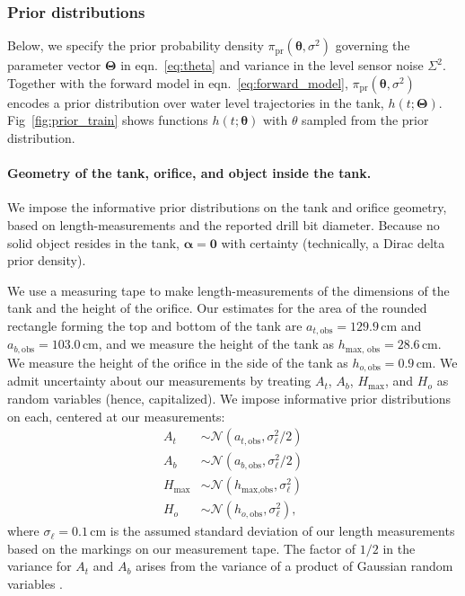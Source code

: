 \documentclass[openacc]{rsproca_new}%
\begin{document}
\subsubsection{Prior distributions} Below, we specify the prior probability density $\pi_{\text{pr}}(\boldsymbol \theta, \sigma^2)$ governing the parameter vector $\boldsymbol \Theta$ in eqn.~\ref{eq:theta} and variance in the level sensor noise $\Sigma^2$.
Together with the forward model in eqn.~\ref{eq:forward_model}, $\pi_{\text{pr}}(\boldsymbol \theta, \sigma^2)$ encodes a prior distribution over water level trajectories in the tank, $h(t; \boldsymbol \Theta)$. Fig~\ref{fig:prior_train} shows functions $h(t; \boldsymbol \theta)$ with $\theta$ sampled from the prior distribution.


\vspace{-\baselineskip}
\paragraph{Geometry of the tank, orifice, and object inside the tank.} 
We impose the informative prior distributions on the tank and orifice geometry, based on length-measurements and the reported drill bit diameter. 
Because no solid object resides in the tank, $\boldsymbol \alpha=\mathbf{0}$ with certainty (technically, a Dirac delta prior density).

We use a measuring tape to make length-measurements of the dimensions of the tank and the height of the orifice. 
Our estimates for the area of the rounded rectangle forming the top and bottom of the tank are $a_{t, \text{obs}}=129.9$\,cm and $a_{b, \text{obs}}=103.0$\,cm, and we measure the height of the tank as $h_{\text{max, obs}}=28.6$\,cm. 
We measure the height of the orifice in the side of the tank as $h_{o, \text{obs}}=0.9$\,cm. 
We admit uncertainty about our measurements by treating $A_t$, $A_b$, $H_{\text{max}}$, and $H_o$ as random variables (hence, capitalized). We impose informative prior distributions on each, centered at our measurements:
\begin{align}
A_t &\sim \mathcal{N}(a_{t, \text{obs}}, \sigma_\ell^2/2) \label{eq:A_t_prior} \\
A_b &\sim \mathcal{N}(a_{b, \text{obs}}, \sigma_\ell^2/2) \\
H_{\text{max}} &\sim \mathcal{N}(h_{\text{max}, \text{obs}}, \sigma_\ell^2) \\
H_o &\sim \mathcal{N}(h_{o, \text{obs}}, \sigma_\ell^2),
\end{align}
where $\sigma_\ell=0.1$\,cm is the assumed standard deviation of our length measurements based on the markings on our measurement tape. The factor of $1/2$ in the variance for $A_t$ and $A_b$ arises from the variance of a product of Gaussian random variables \cite{bromiley2003products}.
\end{document}
